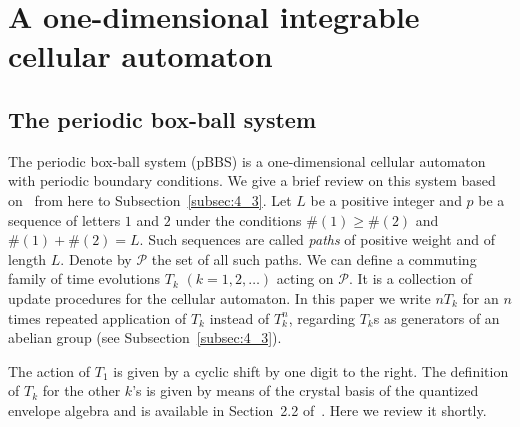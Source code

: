 \documentclass[pdftex]{sigma}
\begin{document}
\section{A one-dimensional integrable cellular automaton}\label{sec:4}
\subsection{The periodic box-ball system}\label{subsec:4_1}

The periodic box-ball system (pBBS) is a one-dimensional cellular automaton with periodic boundary conditions.
We give a brief review on this system based on~\cite{KTT} from here to Subsection~\ref{subsec:4_3}.
Let $L$ be a positive integer and $p$ be a sequence of letters $1$ and $2$ under the conditions
$\# (1) \geq \# (2)$ and $\# (1) + \# (2) = L$.
Such sequences are called {\em paths} of positive weight and of length $L$.
Denote by ${\mathcal P}$ the set of all such paths.
We can def\/ine a commuting family of time evolutions $T_k$ $(k=1,2,\ldots)$ acting on ${\mathcal P}$.
It is a collection of update procedures for the cellular automaton.
In this paper we write $n T_k$ for an $n$ times repeated application of $T_k$ instead of $T_k^n$,
regarding $T_k$s as generators of an abelian group (see Subsection~\ref{subsec:4_3}).

The action of $T_1$ is given by a cyclic shift by one digit to the right.
The def\/inition of $T_k$ for the other $k$'s is given by means of the crystal basis of
the quantized envelope algebra \cite{K}
and is available in Section~2.2 of~\cite{KTT}.
Here we review it shortly.
\end{document}
